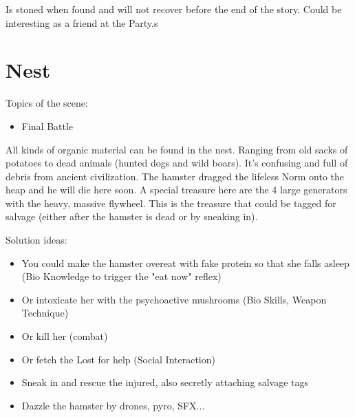 \begin{npcBox}[title=Lucien\, Director]
    \begin{stressSection}
    \end{stressSection}
    \begin{tabularx}{\textwidth}{ XX }
    \end{tabularx}

    \begin{consequences}
    \item {}
    \item {}
    \item {}
    \end{consequences}

    \begin{npcDescription}
    Is stoned when found and will not recover before the end of the story. Could be interesting as a friend at the Party.s
    \end{npcDescription}

\end{npcBox}

\section{Nest}

Topics of the scene:
\begin{itemize}
\item Final Battle
\end{itemize}

All kinds of organic material can be found in the nest. Ranging from old sacks of potatoes to dead animals (hunted dogs and wild boars).
It's confusing and full of debris from ancient civilization.
The hamster dragged the lifeless Norm onto the heap and he will die here soon.
A special treasure here are the 4 large generators with the heavy, massive flywheel. This is the treasure that could be tagged for salvage (either after the hamster is dead or by sneaking in).

Solution ideas:
\begin{itemize}
\item You could make the hamster overeat with fake protein so that she falls asleep (Bio
Knowledge to trigger the "eat now" reflex)
\item Or intoxicate her with the psychoactive mushrooms (Bio Skills, Weapon Technique)
\item Or kill her (combat)
\item Or fetch the Lost for help (Social Interaction)
\item Sneak in and rescue the injured, also secretly attaching salvage tags
\item Dazzle the hamster by drones, pyro, SFX...
\end{itemize}


